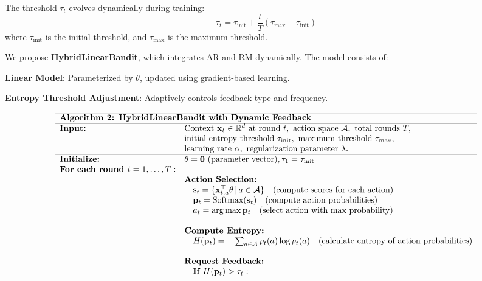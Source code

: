 The threshold \(\tau_t\) evolves dynamically during training:
\[
\tau_t = \tau_{\text{init}} + \frac{t}{T} (\tau_{\text{max}} - \tau_{\text{init}})
\]
where \(\tau_{\text{init}}\) is the initial threshold, and \(\tau_{\text{max}}\) is the maximum threshold.

We propose \textbf{HybridLinearBandit}, which integrates AR and RM dynamically. The model consists of:

\textbf{Linear Model}: Parameterized by \(\theta\), updated using gradient-based learning.

\textbf{Entropy Threshold Adjustment}: Adaptively controls feedback type and frequency.



\[
\begin{array}{ll}
\hline
\multicolumn{2}{l}{\textbf{Algorithm 2: HybridLinearBandit with Dynamic Feedback}} \\
\hline
\textbf{Input:} & \text{Context } \mathbf{x}_t \in \mathbb{R}^d \text{ at round } t, \text{ action space } \mathcal{A}, \text{ total rounds } T, \\
& \text{initial entropy threshold } \tau_{\text{init}}, \text{ maximum threshold } \tau_{\text{max}}, \\
& \text{learning rate } \alpha, \text{ regularization parameter } \lambda. \\
\hline
\textbf{Initialize:} & \theta = \mathbf{0} \text{ (parameter vector)}, \tau_1 = \tau_{\text{init}} \\
\textbf{For each round } t = 1, \dots, T: & \\
& \textbf{Action Selection:} \\
& \quad \mathbf{s}_t = \{\mathbf{x}_{t,a}^\top \theta \,|\, a \in \mathcal{A}\} \quad (\text{compute scores for each action}) \\
& \quad \mathbf{p}_t = \text{Softmax}(\mathbf{s}_t) \quad (\text{compute action probabilities}) \\
& \quad a_t = \arg\max \mathbf{p}_t \quad (\text{select action with max probability}) \\
\\
& \textbf{Compute Entropy:} \\
& \quad H(\mathbf{p}_t) = -\sum_{a \in \mathcal{A}} p_t(a) \log p_t(a) \quad (\text{calculate entropy of action probabilities}) \\
\\
& \textbf{Request Feedback:} \\
& \quad \textbf{If } H(\mathbf{p}_t) > \tau_t: \\

\end{array}\]
